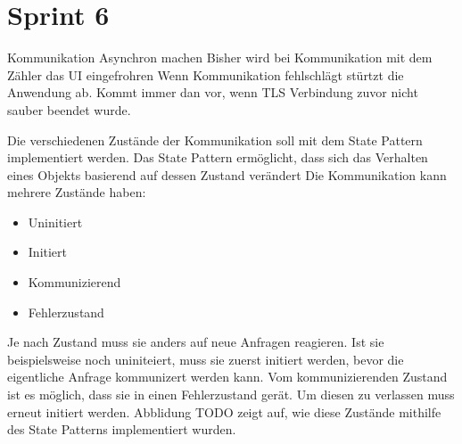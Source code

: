 \section{Sprint 6}





Kommunikation Asynchron machen
Bisher wird bei Kommunikation mit dem Zähler das UI eingefrohren
Wenn Kommunikation fehlschlägt stürtzt die Anwendung ab.
Kommt immer dan vor, wenn TLS Verbindung zuvor nicht sauber beendet wurde.

Die verschiedenen Zustände der Kommunikation soll mit dem State Pattern implementiert werden.
Das State Pattern ermöglicht, dass sich das Verhalten eines Objekts basierend auf dessen Zustand verändert \parencite{designPatterns}
Die Kommunikation kann mehrere Zustände haben:
\begin{itemize}
   \item Uninitiert
   \item Initiert
   \item Kommunizierend
   \item Fehlerzustand
\end{itemize}
Je nach Zustand muss sie anders auf neue Anfragen reagieren.
Ist sie beispielsweise noch uniniteiert, muss sie zuerst initiert werden, bevor die eigentliche Anfrage kommunizert werden kann.
Vom kommunizierenden Zustand ist es möglich, dass sie in einen Fehlerzustand gerät.
Um diesen zu verlassen muss erneut initiert werden.
Abblidung TODO zeigt auf, wie diese Zustände mithilfe des State Patterns implementiert wurden.
